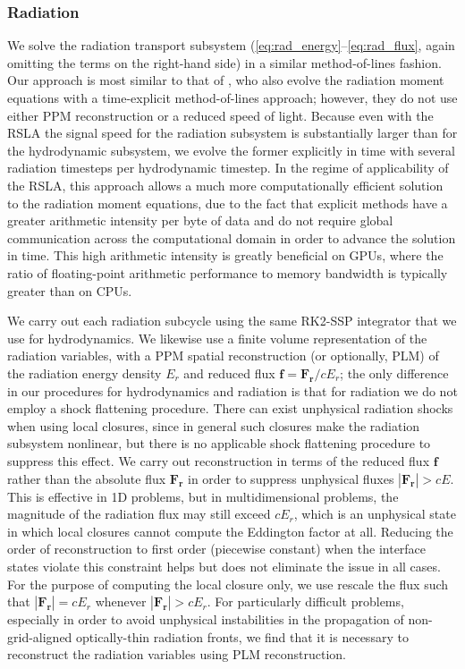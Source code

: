 \documentclass[fleqn,usenatbib]{mnras}
\begin{document}
\subsubsection{Radiation}
\label{sssec:radiation}

We solve the radiation transport subsystem (\autoref{eq:rad_energy}--\autoref{eq:rad_flux}, again omitting the terms on the right-hand side) in a similar method-of-lines fashion. Our approach is most similar to that of \cite{Skinner_2019}, who also evolve the radiation moment equations with a time-explicit method-of-lines approach; however, they do not use either PPM reconstruction or a reduced speed of light. Because even with the RSLA the signal speed for the radiation subsystem is substantially larger than for the hydrodynamic subsystem, we evolve the former explicitly in time with several radiation timesteps per hydrodynamic timestep. In the regime of applicability of the RSLA, this approach allows a much more computationally efficient solution to the radiation moment equations, due to the fact that explicit methods have a greater arithmetic intensity per byte of data and do not require global communication across the computational domain in order to advance the solution in time. This high arithmetic intensity is greatly beneficial on GPUs, where the ratio of floating-point arithmetic performance to memory bandwidth is typically greater than on CPUs.

We carry out each radiation subcycle using the same RK2-SSP integrator \citep{Shu_1988} that we use for hydrodynamics. We likewise use a finite volume representation of the radiation variables, with a PPM spatial reconstruction (or optionally, PLM) of the radiation energy density $E_r$ and reduced flux $\mathbf{f} = \mathbf{F_r} / cE_r$; the only difference in our procedures for hydrodynamics and radiation is that for radiation we do not employ a shock flattening procedure. There can exist unphysical radiation shocks when using local closures, since in general such closures make the radiation subsystem nonlinear, but there is no applicable shock flattening procedure to suppress this effect. We carry out reconstruction in terms of the reduced flux $\mathbf{f}$ rather than the absolute flux $\mathbf{F_r}$ in order to suppress unphysical fluxes $|\mathbf{F_r}| > cE$. This is effective in 1D problems, but in multidimensional problems, the magnitude of the radiation flux may still exceed $cE_r$, which is an unphysical state in which local closures cannot compute the Eddington factor at all. Reducing the order of reconstruction to first order (piecewise constant) when the interface states violate this constraint helps but does not eliminate the issue in all cases. For the purpose of computing the local closure only, we use rescale the flux such that $|\mathbf{F_r}| = cE_r$ whenever $|\mathbf{F_r}| > cE_r$.  For particularly difficult problems, especially in order to avoid unphysical instabilities in the propagation of non-grid-aligned optically-thin radiation fronts, we find that it is necessary to reconstruct the radiation variables using PLM reconstruction.
\end{document}

